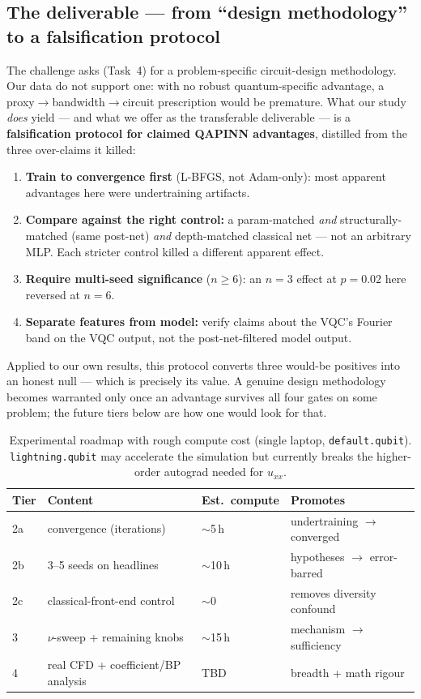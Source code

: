 \documentclass[11pt]{article}
\begin{document}
\subsection{The deliverable --- from ``design methodology'' to a falsification protocol}
The challenge asks (Task~4) for a problem-specific circuit-design methodology. Our
data do not support one: with no robust quantum-specific advantage, a
proxy$\to$bandwidth$\to$circuit prescription would be premature. What our study
\emph{does} yield --- and what we offer as the transferable deliverable --- is a
\textbf{falsification protocol for claimed QAPINN advantages}, distilled from the
three over-claims it killed:
\begin{enumerate}[nosep]
  \item \textbf{Train to convergence first} (L-BFGS, not Adam-only): most apparent
  advantages here were undertraining artifacts.
  \item \textbf{Compare against the right control:} a param-matched \emph{and}
  structurally-matched (same post-net) \emph{and} depth-matched classical net --- not
  an arbitrary MLP. Each stricter control killed a different apparent effect.
  \item \textbf{Require multi-seed significance} ($n\!\ge\!6$): an $n\!=\!3$ effect at
  $p\!=\!0.02$ here reversed at $n\!=\!6$.
  \item \textbf{Separate features from model:} verify claims about the VQC's Fourier
  band on the VQC output, not the post-net-filtered model output.
\end{enumerate}
Applied to our own results, this protocol converts three would-be positives into an
honest null --- which is precisely its value. A genuine design methodology becomes
warranted only once an advantage survives all four gates on some problem; the future
tiers below are how one would look for that.

\begin{table}[t]
  \centering \small
  \begin{tabular}{llll}
    \toprule
    Tier & Content & Est.\ compute & Promotes \\ \midrule
    2a & convergence (iterations) & $\sim$5\,h & undertraining $\to$ converged \\
    2b & 3--5 seeds on headlines & $\sim$10\,h & hypotheses $\to$ error-barred \\
    2c & classical-front-end control & $\sim$0 & removes diversity confound \\
    3 & $\nu$-sweep + remaining knobs & $\sim$15\,h & mechanism $\to$ sufficiency \\
    4 & real CFD + coefficient/BP analysis & TBD & breadth + math rigour \\
    \bottomrule
  \end{tabular}
  \caption{Experimental roadmap with rough compute cost (single laptop,
  \texttt{default.qubit}). \texttt{lightning.qubit} may accelerate the simulation
  but currently breaks the higher-order autograd needed for $u_{xx}$.}
  \label{tab:roadmap}
\end{table}
\end{document}
